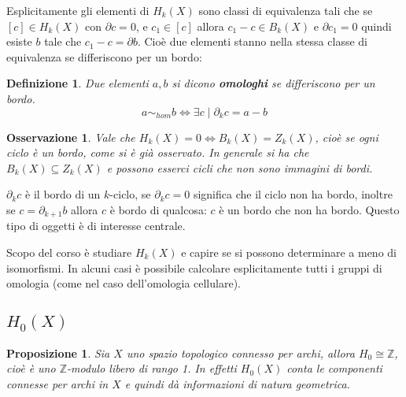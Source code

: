 \documentclass[10pt, twoside=false, x11names]{scrbook}
\newtheorem{proposition}[theorem]{Proposizione}
\newtheorem{osservation}[theorem]{Osservazione}
\newtheorem{definition}[theorem]{Definizione}
\newcommand{\Z}{\mathbb{Z}}
\begin{document}
Esplicitamente gli elementi di $ H_k(X) $ sono classi di equivalenza tali che se $ [c] \in H_k(X) $
con $ \partial c = 0 $, e $ c_1 \in [c] $ allora
$ c_1 - c \in B_k(X) $ e $ \partial c_1 = 0 $ quindi esiste $ b $ tale che $ c_1 - c = \partial b $.
Cioè due elementi stanno nella stessa classe di equivalenza se differiscono per un bordo:

\begin{definition}
  Due elementi $ a,b $ si dicono \textbf{omologhi}  se differiscono per un bordo.
  \[
    a \sim_{hom} b \Leftrightarrow \exists c \; | \; \partial_k c = a - b
  \]
\end{definition}

\begin{osservation}
  Vale che $  H_k(X) = 0 \Leftrightarrow B_k(X) = Z_k(X) $, cioè se ogni ciclo è un bordo, come si è già osservato.
  In generale si ha che $ B_k(X) \subseteq Z_k(X) $ e possono esserci cicli che non sono immagini di bordi.
\end{osservation}

$ \partial_k c $ è il bordo di un $ k $-ciclo, se $ \partial_k c = 0 $ significa che il ciclo non ha bordo, inoltre
se $ c = \partial_{k+1} b $ allora $ c $ è bordo di qualcosa: $ c $ è un bordo che non ha bordo. Questo tipo
di oggetti è di interesse centrale.

Scopo del corso è studiare $ H_k(X) $ e capire se si possono determinare a meno di isomorfismi.
In alcuni casi è possibile calcolare esplicitamente tutti i gruppi di omologia (come nel caso dell'omologia
cellulare).

\subsection{$ H_0(X) $}

\begin{proposition}
  Sia $ X $ uno spazio topologico connesso per archi, allora $ H_0 \cong \Z $, cioè è uno $ \Z $-modulo libero di rango 1.
  In effetti $ H_0(X) $ \emph{conta} le componenti connesse per archi in $ X $ e quindi dà informazioni di natura geometrica.
\end{proposition}
\end{document}
